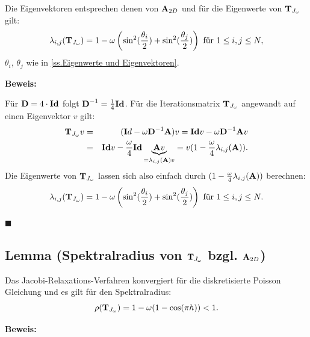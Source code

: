 Die Eigenvektoren entsprechen denen von ${\textbf{A}}_{2D}$ und für die Eigenwerte von ${\textbf{T}}_{J_{\omega}}$ gilt:
\begin{equation}
\lambda_{i,j}({\textbf{T}}_{J_{\omega}}) = 1 - \omega \left(\sin^{2}(\frac {\theta_{i}} {2}) + \sin^{2}(\frac {\theta_{j}} {2}) \right) \textnormal{ für } 1 \le i,j \le N,\label{eq.Jacobi-Relaxation-Eigenwerte}
\end{equation}
$\theta_{i}$, $\theta_{j}$ wie in \autoref{ss.Eigenwerte und Eigenvektoren}.

\textbf{Beweis:}\label{sss.EW JacobiRelax}

Für ${\textbf{D}} = 4 \cdot {\textbf{Id}}$ folgt ${\textbf{D}}^{-1} = \frac {1} {4} {\textbf{Id}}$. Für die Iterationsmatrix ${\textbf{T}}_{J_{\omega}}$ angewandt auf einen Eigenvektor $v$ gilt:
\begin{eqnarray}
{\textbf{T}}_{J_{\omega}}v &=& ({\textbf{I}}d - \omega {\textbf{D}}^{-1}{\textbf{A}})v = {\textbf{Id}} v - \omega {\textbf{D}}^{-1} {\textbf{A}} v \notag \\
&=&{\textbf{Id}} v - \frac {\omega} {4} {\textbf{Id}} \underbrace{{\textbf{A}}v}_{=\lambda_{i,j}({\textbf{A}}) v} = v (1 - \frac {\omega} {4} \lambda_{i,j}({\textbf{A}})). \notag
\end{eqnarray}
Die Eigenwerte von ${\textbf{T}}_{J_{\omega}}$ lassen sich also einfach durch $(1 - \frac {\omega} {4} \lambda_{i,j}({\textbf{A}}))$ berechnen:
\begin{equation}
\lambda_{i,j}({\textbf{T}}_{J_{\omega}}) = 1 - \omega \left(\sin^{2}(\frac {\theta_{i}} {2}) + \sin^{2}(\frac {\theta_{j}} {2}) \right) \textnormal{ für } 1 \le i,j \le N. \notag
\end{equation}
\begin{flushright}
$\blacksquare$
\end{flushright}

\subsection{Lemma (Spektralradius von ${\textbf{T}}_{J_{\omega}}$ bzgl. ${\textbf{A}}_{2D}$)}\label{ss.Spektralradius Jacobi Relax}

Das Jacobi-Relaxations-Verfahren konvergiert für die diskretisierte Poisson Gleichung und es gilt für den Spektralradius:
\begin{equation}
\rho({\textbf{T}}_{J_{\omega}}) = 1 - \omega(1 - \cos (\pi h)) < 1.
\end{equation}

\textbf{Beweis:}\label{b.Spektral JacobiRelax}


